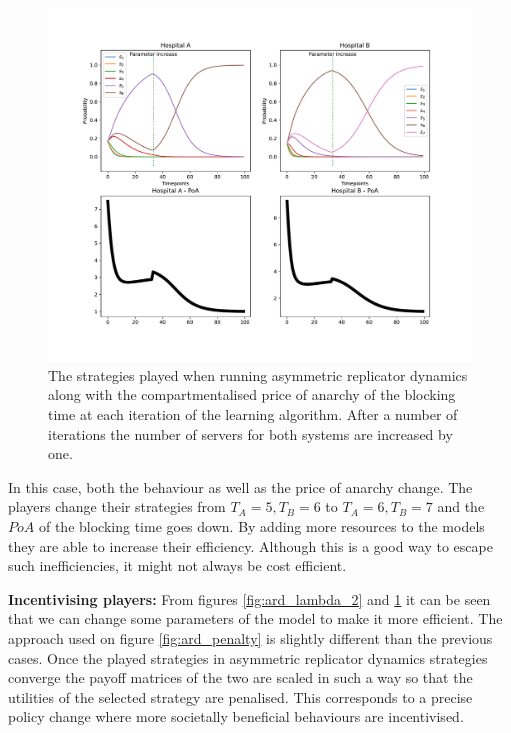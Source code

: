 \begin{figure}[H]
    \includegraphics[width=\textwidth]{imgs/asymmetric_rd_and_PoA/asymmetric_increase_C.pdf}
    \caption{
        The strategies played when running asymmetric replicator dynamics
        along with the compartmentalised price of anarchy of the blocking time 
        at each iteration of the learning algorithm. After a number of 
        iterations the number of servers for both systems are increased by one.
    }
    \label{fig:ard_num_of_servers}
\end{figure}

In this case, both the behaviour as well as the price of anarchy change.
The players change their strategies from \(T_A = 5, T_B = 6\) to 
\(T_A = 6, T_B = 7\) and the \(PoA\) of the blocking time goes down.
By adding more resources to the models they are able to increase their 
efficiency.
Although this is a good way to escape such inefficiencies, it might not always
be cost efficient.

\textbf{Incentivising players:}
From figures \ref{fig:ard_lambda_2} and \ref{fig:ard_num_of_servers} it can be
seen that we can change some parameters of the model to make it more efficient.
The approach used on figure \ref{fig:ard_penalty} is slightly different than 
the previous cases.
Once the played strategies in asymmetric replicator dynamics strategies 
converge the payoff matrices of the two are scaled in such a way so that the 
utilities of the selected strategy are penalised. This corresponds to a precise
policy change where more societally beneficial behaviours are incentivised.

